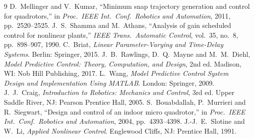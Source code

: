 \documentclass[11pt,a4paper]{article}
\numberwithin{equation}{section}
\begin{document}
\begin{thebibliography}{9}
 D.~Mellinger and V.~Kumar, ``Minimum snap trajectory generation and control for quadrotors,'' in \emph{Proc.\ IEEE Int.\ Conf.\ Robotics and Automation}, 2011, pp.~2520--2525.
 J.~S.~Shamma and M.~Athans, ``Analysis of gain scheduled control for nonlinear plants,'' \emph{IEEE Trans.\ Automatic Control}, vol.~35, no.~8, pp.~898--907, 1990.
 C.~Briat, \emph{Linear Parameter-Varying and Time-Delay Systems}. Berlin: Springer, 2015.
 J.~B.~Rawlings, D.~Q.~Mayne and M.~M.~Diehl, \emph{Model Predictive Control: Theory, Computation, and Design}, 2nd ed. Madison, WI: Nob Hill Publishing, 2017.
 L.~Wang, \emph{Model Predictive Control System Design and Implementation Using MATLAB}. London: Springer, 2009.
 J.~J.~Craig, \emph{Introduction to Robotics: Mechanics and Control}, 3rd ed. Upper Saddle River, NJ: Pearson Prentice Hall, 2005.
 S.~Bouabdallah, P.~Murrieri and R.~Siegwart, ``Design and control of an indoor micro quadrotor,'' in \emph{Proc.\ IEEE Int.\ Conf.\ Robotics and Automation}, 2004, pp.~4393--4398.
 J.-J.~E.~Slotine and W.~Li, \emph{Applied Nonlinear Control}. Englewood Cliffs, NJ: Prentice Hall, 1991.
\end{thebibliography}
\end{document}
